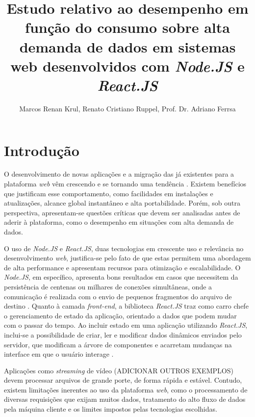 \documentclass[12pt]{article}
\title{Estudo relativo ao desempenho em função do consumo sobre alta demanda de dados em sistemas web desenvolvidos com \textit{Node.JS} e \textit{React.JS}}
\author{Marcos Renan Krul\inst{1}, Renato Cristiano Ruppel\inst{1}, Prof. Dr. Adriano Ferrsa\inst{1}}
\begin{document}
 

\maketitle


\begin{resumo} 
\end{resumo}


\begin{abstract} 
\end{abstract}


\section{Introdução}

O desenvolvimento de novas aplicações e a migração das já existentes para a plataforma \textit{web} 
vêm crescendo e se tornando uma tendência \cite{SOUZAB}. Existem benefícios que justificam esse comportamento,
como facilidades em instalações e atualizações, alcance global instantâneo e alta portabilidade. Porém,
sob outra perspectiva, apresentam-se questões críticas que devem ser analisadas antes de aderir à plataforma, como
o desempenho em situações com alta demanda de dados.

O uso de \textit{Node.JS} e \textit{React.JS}, duas tecnologias em crescente uso e relevância no
desenvolvimento \textit{web}, justifica-se pelo fato de que estas permitem uma abordagem de alta
performance e apresentam recursos para otimização e escalabilidade. O \textit{Node.JS}, em específico, apresenta
bons resultados em casos que necessitem da persistência de centenas ou milhares de conexões
simultâneas, onde a comunicação é realizada com o envio de pequenos fragmentos do arquivo de destino
\cite[p. 112]{EJSMONT}. Quanto à camada \textit{front-end}, a biblioteca \textit{React.JS} traz como
carro chefe o gerenciamento de estado da aplicação, orientado a dados que podem mudar com o passar do tempo.
Ao incluir estado em uma aplicação utilizando \textit{React.JS}, inclui-se a possibilidade de criar, ler
e modificar dados dinâmicos enviados pelo servidor, que modificam a árvore de componentes e acarretam 
mudanças na interface em que o usuário interage \cite[p. 97]{BANKSEPORCELLO}.

Aplicações como \textit{streaming} de vídeo (ADICIONAR OUTROS EXEMPLOS) devem processar arquivos de 
grande porte, de forma rápida e estável. Contudo, existem limitações inerentes ao uso da 
plataforma \textit{web}, como o processamento de diversas requisições que exijam muitos dados, 
tratamento do alto fluxo de dados pela máquina cliente e os limites impostos pelas tecnologias escolhidas.
\end{document}
